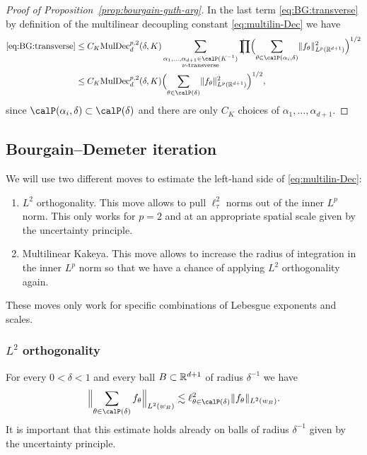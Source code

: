 \begin{proof}[Proof of Proposition~\ref{prop:bourgain-guth-arg}]
In the last term \eqref{eq:BG:transverse} by definition of the multilinear decoupling constant \eqref{eq:multilin-Dec} we have
\begin{align*}
\eqref{eq:BG:transverse}
&\leq
C_{K} \MulDec^{p,2}_{d}(\delta,K) \sum_{\substack{\alpha_{1},\dotsc,\alpha_{d+1}\in\Part{K^{-1}}\\\nu\text{-transverse}}} \avprod \Bigl( \sum_{\theta\in\Part[\alpha_{i}]{\delta}} \norm{ f_{\theta} }_{L^{p}(\R^{d+1})}^{2} \Bigr)^{1/2}\\
&\leq
C_{K} \MulDec^{p,2}_{d}(\delta,K) \Bigl( \sum_{\theta\in\Part{\delta}} \norm{ f_{\theta} }_{L^{p}(\R^{d+1})}^{2} \Bigr)^{1/2},
\end{align*}
since $\Part[\alpha_{i}]{\delta} \subset \Part{\delta}$ and there are only $C_{K}$ choices of $\alpha_{1},\dotsc,\alpha_{d+1}$.
\end{proof}

% 

\subsection{Bourgain--Demeter iteration}
We will use two different moves to estimate the left-hand side of \eqref{eq:multilin-Dec}:
\begin{enumerate}
\item $L^{2}$ orthogonality.
This move allows to pull $\ell^{2}_{\tau}$ norms out of the inner $L^{p}$ norm.
This only works for $p=2$ and at an appropriate spatial scale given by the uncertainty principle.
\item Multilinear Kakeya.
This move allows to increase the radius of integration in the inner $L^{p}$ norm so that we have a chance of applying $L^{2}$ orthogonality again.
\end{enumerate}
These moves only work for specific combinations of Lebesgue exponents and scales.
\subsubsection{$L^2$ orthogonality}
\label{sec:L2-orth}
For every $0<\delta<1$ and every ball $B \subset \mathbb{R}^{d+1}$ of radius $\delta^{-1}$ we have
\begin{equation}\label{eq:L2-orth}
\norm[\Big]{\sum_{\theta\in\Part{\delta}}f_\theta }_{L^2(w_B)}
\lesssim
\ell^{2}_{\theta\in\Part{\delta}}\norm{f_\theta }_{L^2(w_B)}.
\end{equation}
It is important that this estimate holds already on balls of radius $\delta^{-1}$ given by the uncertainty principle.

